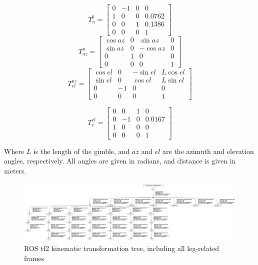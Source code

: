 \documentclass[twocolumn]{article}
\begin{document}
\begin{itemize}
    \[
    T^b_n = \begin{bmatrix} 0 & -1 & 0 & 0 \\
                            1 & 0 & 0 & 0.0762 \\
                            0 & 0 & 1 & 0.1386 \\
                            0 & 0 & 0 & 1 \end{bmatrix}
    \]
    \[
    T^n_{az} = \begin{bmatrix} \cos{az} & 0 & \sin{az} & 0 \\
                               \sin{az} & 0 & -\cos{az} & 0 \\
                               0 & 1 & 0 & 0 \\
                               0 & 0 & 0 & 1 \end{bmatrix}
    \]
    \[
    T^{az}_{el} = \begin{bmatrix} \cos{el} & 0 & -\sin{el} & L \cos{el} \\
                                  \sin{el} & 0 & \cos{el} & L \sin{el} \\
                                  0 & -1 & 0 & 0 \\
                                  0 & 0 & 0 & 1\end{bmatrix}
    \]

    \[
    T^{el}_{c} = \begin{bmatrix} 0 &  0 & 1 & 0 \\
                                 0 & -1 & 0 & 0.0167 \\
                                 1 &  0 & 0 & 0 \\
                                 0 &  0 & 0 & 1 \end{bmatrix}
    \]

Where $L$ is the length of the gimble, and $az$ and $el$ are the azimuth and elevation angles, respectively. All angles are given in radians, and distance is given in meters.

\end{itemize}

\begin{figure}[h]
    \centering
    \includegraphics[scale=0.11]{figures/tf_tree.png}
    \caption{ ROS tf2 \cite{tf2} kinematic transformation tree, including all leg-related frames }
    \label{fig:tf_tree}
\end{figure}
\end{document}
